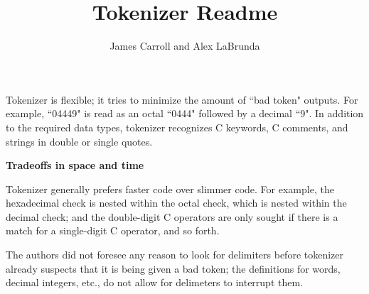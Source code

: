 \documentclass{article}
\title{Tokenizer Readme}
\author{James Carroll and Alex LaBrunda}
\begin{document}
\setlength{\parindent}{4em}
\setlength{\parskip}{1em}
\renewcommand{\baselinestretch}{2.0}

\maketitle
	Tokenizer is flexible; it tries to minimize the amount of ``bad token" outputs. For example, ``04449" is read as an octal ``0444" followed by a decimal ``9". In addition to the required data types, tokenizer recognizes C keywords, C comments, and strings in double or single quotes. \par
	
{\huge\bfseries Tradeoffs in space and time \par}

	Tokenizer generally prefers faster code over slimmer code. For example, the hexadecimal check is nested within the octal check, which is nested within the decimal check; and the double-digit C operators are only sought if there is a match for a single-digit C operator, and so forth. \par

	The authors did not foresee any reason to look for delimiters before tokenizer already suspects that it is being given a bad token; the definitions for words, decimal integers, etc., do not allow for delimeters to interrupt them.
\end{document}
